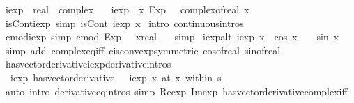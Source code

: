 \documentclass{article}
\theoremstyle{definition}
\begin{document}
\begin{isabellebody}
\isamarkupfalse%
\ iexp\ {\isacharcolon}{\isacharcolon}\ {\isachardoublequoteopen}real\ {\isasymRightarrow}\ complex{\isachardoublequoteclose}\ \isanewline
\ \ {\isachardoublequoteopen}iexp\ {\isasymequiv}\ {\isacharparenleft}{\isasymlambda}x{\isachardot}\ Exp\ {\isacharparenleft}{\isasymi}\ {\isacharasterisk}\ complex{\isacharunderscore}of{\isacharunderscore}real\ x{\isacharparenright}{\isacharparenright}{\isachardoublequoteclose}\isanewline
\isanewline
{}\isamarkupfalse%
\ isCont{\isacharunderscore}iexp\ {\isacharbrackleft}simp{\isacharbrackright}{\isacharcolon}\ {\isachardoublequoteopen}isCont\ iexp\ x{\isachardoublequoteclose}\isanewline
{}\isamarkupfalse%
\ {\isacharparenleft}intro\ continuous{\isacharunderscore}intros{\isacharparenright}%
\isanewline
{}\isamarkupfalse%
\ cmod{\isacharunderscore}iexp\ {\isacharbrackleft}simp{\isacharbrackright}{\isacharcolon}\ {\isachardoublequoteopen}cmod\ {\isacharparenleft}Exp\ {\isacharparenleft}{\isasymi}\ {\isacharasterisk}\ {\isacharparenleft}x{\isacharcolon}{\isacharcolon}real{\isacharparenright}{\isacharparenright}{\isacharparenright}\ {\isacharequal}\ {}{\isachardoublequoteclose}\isanewline
{}\isamarkupfalse%
\ simp%
\isanewline
{}\isamarkupfalse%
\ iexp{\isacharunderscore}alt{\isacharcolon}\ {\isachardoublequoteopen}iexp\ x\ {\isacharequal}\ cos\ x\ {\isacharplus}\ {\isasymi}\ {\isacharasterisk}\ sin\ x{\isachardoublequoteclose}\isanewline
{}\isamarkupfalse%
\ {\isacharparenleft}simp\ add{\isacharcolon}\ complex{\isacharunderscore}eq{\isacharunderscore}iff\ cis{\isacharunderscore}conv{\isacharunderscore}exp{\isacharbrackleft}symmetric{\isacharbrackright}\ cos{\isacharunderscore}of{\isacharunderscore}real\ sin{\isacharunderscore}of{\isacharunderscore}real{\isacharparenright}%
\isanewline
{}\isamarkupfalse%
\ has{\isacharunderscore}vector{\isacharunderscore}derivative{\isacharunderscore}iexp{\isacharbrackleft}derivative{\isacharunderscore}intros{\isacharbrackright}{\isacharcolon}\isanewline
\ \ {\isachardoublequoteopen}{\isacharparenleft}iexp\ has{\isacharunderscore}vector{\isacharunderscore}derivative\ {\isasymi}\ {\isacharasterisk}\ iexp\ x{\isacharparenright}\ {\isacharparenleft}at\ x\ within\ s{\isacharparenright}{\isachardoublequoteclose}\isanewline
{}\isamarkupfalse%
\ {\isacharparenleft}auto\ intro{\isacharbang}{\isacharcolon}\ derivative{\isacharunderscore}eq{\isacharunderscore}intros\ simp{\isacharcolon}\ Re{\isacharunderscore}exp\ Im{\isacharunderscore}exp\ has{\isacharunderscore}vector{\isacharunderscore}derivative{\isacharunderscore}complex{\isacharunderscore}iff{\isacharparenright}%
\end{isabellebody}
\end{document}
